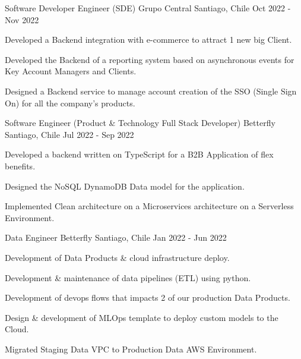 

  \cventry
  {Software Developer Engineer (SDE)}
  {Grupo Central}
  {Santiago, Chile}
  {Oct 2022 - Nov 2022}
  {
    \begin{cvitems} %
      \item {Developed a Backend integration with e-commerce to attract 1 new big Client.}
      \item {Developed the Backend of a reporting system based on asynchronous events for Key Account Managers and Clients.}
      \item {Designed a Backend service to manage account creation of the SSO (Single Sign On) for all the company's products.}
    \end{cvitems}
  }
  \newline
  \cventry
  {Software Engineer (Product \& Technology Full Stack Developer)} %
  {Betterfly} %
  {Santiago, Chile} %
  {Jul 2022 - Sep 2022} %
  {
    \begin{cvitems} %
      \item {Developed a backend written on TypeScript for a B2B Application of flex benefits.}
      \item {Designed the NoSQL DynamoDB Data model for the application.}
      \item {Implemented Clean architecture on a Microservices architecture on a Serverless Environment.}
    \end{cvitems}
  }
  \newline
  \cventry
  {Data Engineer} %
  {Betterfly} %
  {Santiago, Chile} %
  {Jan 2022 - Jun 2022} %
  {
    \begin{cvitems} %
      \item {Development of Data Products \& cloud infrastructure deploy.}
      \item {Development \& maintenance of data pipelines (ETL) using python.}
      \item {Development of devops flows that impacts 2 of our production Data Products.}
      \item {Design \& development of MLOps template to deploy custom models to the Cloud.}
      \item {Migrated Staging Data VPC to Production Data AWS Environment.}
    \end{cvitems}
  }
  \newline
